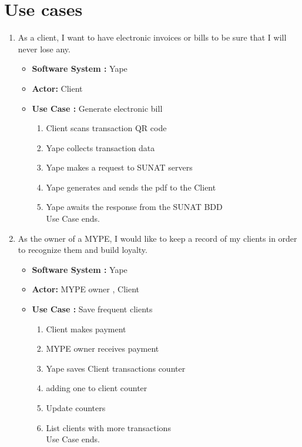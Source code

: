 \documentclass{article}
\begin{document}
\section{Use cases}
\begin{enumerate}

\item As a client, I want to have electronic invoices or bills to be sure that I will never lose any.
   \begin{itemize}
        \item \textbf{Software System :} Yape 
        \item \textbf{Actor: } Client
        \item \textbf{Use Case : } Generate electronic bill
        \begin{enumerate}
            \item Client scans transaction QR code
            \item Yape collects transaction data
            \item Yape makes a request to SUNAT servers
            \item Yape generates and sends the pdf to the Client
            \item Yape awaits the response from the SUNAT BDD\\
            Use Case ends.
        \end{enumerate}
    \end{itemize}

    \item As the owner of a MYPE, I would like to keep a record of my clients in order to recognize them and build loyalty.
    \begin{itemize}
        \item \textbf{Software System :} Yape
        \item \textbf{Actor: } MYPE owner , Client
        \item \textbf{Use Case : } Save frequent clients 
        \begin{enumerate}
            \item Client makes payment
            \item MYPE owner receives payment 
            \item Yape saves Client transactions counter            
            \item adding one to client counter
            \item Update counters
            \item List clients with more transactions \\
            Use Case ends.
        \end{enumerate}
    \end{itemize}
    

\end{enumerate}
\end{document}

